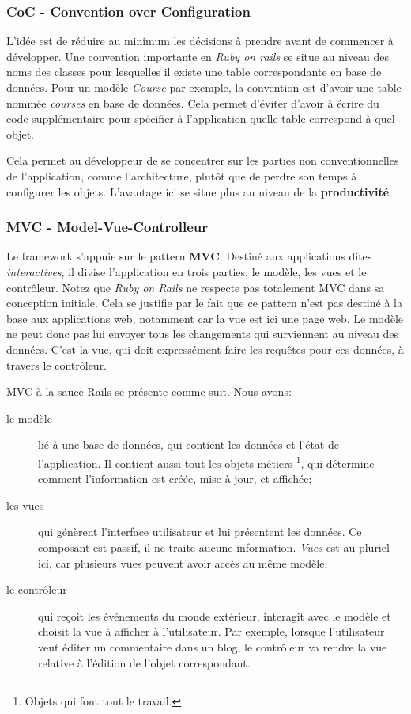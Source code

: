 \subsubsection{CoC - Convention over Configuration}
L'idée est de réduire au minimum les décisions à prendre avant de commencer à développer. Une convention importante en \textit{Ruby on rails} se situe au niveau des noms des classes pour lesquelles il existe une table correspondante en base de données. Pour un modèle \textit{Course} par exemple, la convention est d'avoir une table nommée \textit{courses} en base de données. Cela permet d'éviter d'avoir à écrire du code supplémentaire pour spécifier à l'application quelle table correspond à quel objet. 

Cela permet au développeur de se concentrer sur les parties non conventionnelles de l'application, comme l'architecture, plutôt que de perdre son temps à configurer les objets. L'avantage ici se situe plus au niveau de la \textbf{productivité}.
\subsubsection{MVC - Model-Vue-Controlleur}

Le framework s'appuie sur le pattern \textbf{MVC}. Destiné aux applications dites \textit{interactives}, il divise l'application en trois parties; le modèle, les vues et le contrôleur. Notez que \textit{Ruby on Rails} ne respecte pas totalement MVC dans sa conception initiale. Cela se justifie par le fait que ce pattern n'est pas destiné à la base aux applications web, notamment car la vue est ici une page web. Le modèle ne peut donc pas lui envoyer tous les changements qui surviennent au niveau des données. C'est la vue, qui doit expressément faire les requêtes pour ces données, à travers le contrôleur.

MVC à la sauce Rails se présente comme suit. Nous avons:

\begin{description}
\item[le modèle] lié à une base de données, qui contient les données et l'état de l'application. Il contient aussi tout les objets métiers \footnote{Objets qui font tout le travail.}, qui détermine comment l'information est créée, mise à jour, et affichée;
\item[les vues] qui génèrent l'interface utilisateur et lui présentent les données. Ce composant est passif, il ne traite aucune information. \textit{Vues} est au pluriel ici, car plusieurs vues peuvent avoir accès au même modèle;
\item[le contrôleur] qui reçoit les événements du monde extérieur, interagit avec le modèle et choisit la vue à afficher à l'utilisateur. Par exemple, lorsque l'utilisateur veut éditer un commentaire dans un blog, le contrôleur va rendre la vue relative à l'édition de l'objet correspondant. 
\end{description} 

